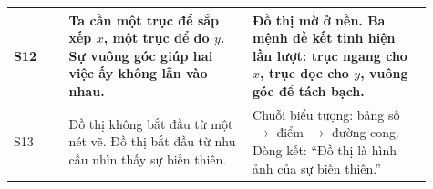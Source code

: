 \documentclass[11pt,a4paper]{article}
\begin{document}
\begin{longtable}{|L{0.12\linewidth}|L{0.40\linewidth}|L{0.39\linewidth}|}
S12 &
Ta cần một trục để sắp xếp \(x\), một trục để đo \(y\). Sự vuông góc giúp hai việc ấy không lẫn vào nhau. &
Đồ thị mờ ở nền. Ba mệnh đề kết tinh hiện lần lượt: trục ngang cho \(x\), trục dọc cho \(y\), vuông góc để tách bạch.\\
\hline

S13 &
Đồ thị không bắt đầu từ một nét vẽ. Đồ thị bắt đầu từ nhu cầu nhìn thấy sự biến thiên. &
Chuỗi biểu tượng: bảng số \(\rightarrow\) điểm \(\rightarrow\) đường cong. Dòng kết: “Đồ thị là hình ảnh của sự biến thiên.”\\
\hline

\end{longtable}
\end{document}

